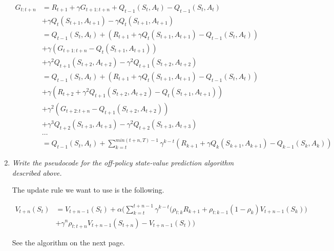 \documentclass[12pt,a4paper]{article}
\begin{document}
\begin{enumerate}
    \begin{align*}
    G_{t: t + n} &= R_{t + 1} + \gamma G_{t + 1: t + n}
    + Q_{t - 1}(S_t, A_t) - Q_{t - 1}(S_t, A_t)\\
    &+ \gamma Q_t(S_{t + 1}, A_{t + 1}) - \gamma Q_t(S_{t + 1}, A_{t + 1})\\
    &=Q_{t - 1}(S_t, A_t) + (R_{t + 1} + \gamma Q_t(S_{t + 1}, A_{t + 1})
    - Q_{t - 1}(S_t, A_t))\\
    &+ \gamma(G_{t + 1: t + n} - Q_t(S_{t + 1}, A_{t + 1}))\\
    &+ \gamma^2 Q_{t + 1}(S_{t + 2}, A_{t + 2}) - \gamma^2 Q_{t + 1}(S_{t + 2}, A_{t + 2})\\
    &= Q_{t - 1}(S_t, A_t)
    + (R_{t + 1} + \gamma Q_t(S_{t + 1}, A_{t + 1}) - Q_{t - 1}(S_t, A_t))\\
    &+ \gamma(R_{t + 2} + \gamma^2 Q_{t + 1}(S_{t + 2}, A_{t + 2}) - Q_t(S_{t + 1}, A_{t + 1}))\\
    &+ \gamma^2(G_{t + 2: t + n} - Q_{t + 1}(S_{t + 2}, A_{t + 2}))\\
    &+ \gamma^3 Q_{t + 2}(S_{t + 3}, A_{t + 3}) - \gamma^2 Q_{t + 2}(S_{t + 3}, A_{t + 3})\\
    &\dots\\
    &= Q_{t - 1}(S_t, A_t) + \sum\limits_{k = t}^{min(t + n, T) - 1}
    \gamma^{k - t}(R_{k + 1} + \gamma Q_k(S_{k + 1}, A_{k + 1}) - Q_{k - 1}(S_k, A_k))
    \end{align*}

  \item
    \textit{Write the pseudocode for the off-policy state-value prediction algorithm
    described above.}

    The update rule we want to use is the following.

    \begin{align*}
      V_{t + n}(S_t) &= V_{t + n - 1}(S_t) + \alpha \Big( \sum\limits_{k = t}^{t + n - 1}
      \gamma^{k - t} \big(\rho_{t:k} R_{k + 1} + \rho_{t: k - 1}
      (1 - \rho_k) V_{t + n - 1} (S_k)\big)\\
      &+ \gamma^n \rho_{t: t + n}V_{t + n - 1}(S_{t + n})
      - V_{t + n - 1}(S_t)\Big)
    \end{align*}

    See the algorithm on the next page.


\end{enumerate}
\end{document}
